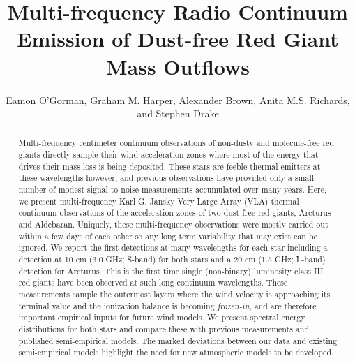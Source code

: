 \documentclass[iop]{emulateapj}
\begin{document}
\title{Multi-frequency Radio Continuum Emission of Dust-free Red Giant Mass Outflows}


\author{Eamon O'Gorman, Graham M. Harper, Alexander Brown, Anita M.S. Richards, and Stephen Drake}


\begin{abstract}

Multi-frequency centimeter continuum observations of non-dusty and molecule-free red giants directly sample their wind acceleration zones where most of the energy that drives their mass loss is being deposited. These stars are feeble thermal emitters at these wavelengths however, and previous observations have provided only a small number of modest signal-to-noise measurements accumulated over many years. Here, we present multi-frequency Karl G. Jansky Very Large Array (VLA) thermal continuum observations of the acceleration zones of two dust-free red giants, Arcturus and Aldebaran. Uniquely, these multi-frequency observations were mostly carried out within a few days of each other so any long term variability that may exist can be ignored. We report the first detections at many wavelengths for each star including a detection at 10 cm (3.0 GHz; S-band) for both stars and a 20 cm (1.5 GHz; L-band) detection for Arcturus. This is the first time single (non-binary) luminosity class III red giants have been observed at such long continuum wavelengths. These measurements sample the outermost layers where the wind velocity is approaching its terminal value and the ionization balance is  becoming \textit{frozen-in}, and are therefore important empirical inputs for future wind models. We present spectral energy distributions for both stars and compare these with previous measurements and published semi-empirical models. The marked deviations between our data and existing semi-empirical models highlight the need for new atmospheric models to be developed.

\end{abstract}
\end{document}
